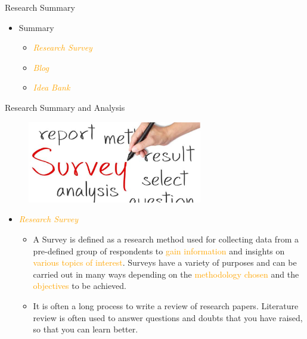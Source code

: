 \documentclass[
 size=14pt,
 paper=smartboard,  %
 mode=present, 		%
 display=slides, 	%
 style=tuliplab,  	%
 pauseslide,
 fleqn,leqno]{powerdot}{}
\begin{document}
\begin{slide}[toc=,bm=]{Research Summary }

\begin{itemize}
  \item Summary
  \begin{itemize}
    \item \textcolor{orange}{\textit{Research Survey}}
         
    \item \textcolor{orange}{\textit{Blog}}
       
    \item \textcolor{orange}{\textit{Idea Bank}}
      
  \end{itemize}
\end{itemize}
\end{slide}

\begin{slide}[toc=,bm=]{Research Summary and Analysis}

\begin{figure}
  \centering
  \includegraphics[width=3in]{figures/survey.eps}\\
\end{figure}

  \begin{itemize}
    \item \textcolor{orange}{\textit{Research Survey}}
         \begin{itemize}
           \item A Survey is defined as a research method used for collecting data from a pre-defined group of respondents to \textcolor{orange}{gain information} and insights on \textcolor{orange}{various topics of interest}. Surveys have a variety of purposes and can be carried out in many ways depending on the \textcolor{orange}{methodology chosen} and the \textcolor{orange}{objectives} to be achieved.
           \item It is often a long process to write a review of research papers. Literature review is often used to answer questions and doubts that you have raised, so that you can learn better.
         \end{itemize}
  \end{itemize}
\end{slide}
\end{document}
